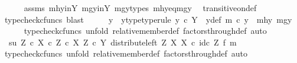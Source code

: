 \begin{isabellebody}
\ \ \ \ \isamarkupfalse%
\ assms\ mhy{\isacharunderscore}{\kern0pt}in{\isacharunderscore}{\kern0pt}Y\ mgy{\isacharunderscore}{\kern0pt}in{\isacharunderscore}{\kern0pt}Y\ mgy{\isacharunderscore}{\kern0pt}types\ mhy{}{\isacharunderscore}{\kern0pt}eq{\isacharunderscore}{\kern0pt}mgy{}\ \isamarkupfalse%
\ transitive{\isacharunderscore}{\kern0pt}on{\isacharunderscore}{\kern0pt}def\isanewline
\ \ \ \ \isamarkupfalse%
\ {\isacharparenleft}{\kern0pt}typecheck{\isacharunderscore}{\kern0pt}cfuncs{\isacharcomma}{\kern0pt}\ blast{\isacharparenright}{\kern0pt}\isanewline
\ \ \isamarkupfalse%
\ \isamarkupfalse%
\ y\ \ y{\isacharunderscore}{\kern0pt}type{\isacharbrackleft}{\kern0pt}type{\isacharunderscore}{\kern0pt}rule{\isacharbrackright}{\kern0pt}{\isacharcolon}{\kern0pt}\ {\isachardoublequoteopen}y\ {\isasymin}\isactrlsub c\ Y{\isachardoublequoteclose}\ \ y{\isacharunderscore}{\kern0pt}def{\isacharcolon}{\kern0pt}\ {\isachardoublequoteopen}m\ {\isasymcirc}\isactrlsub c\ y\ {\isacharequal}{\kern0pt}\ {\isasymlangle}mhy{}{\isacharcomma}{\kern0pt}\ mgy{}{\isasymrangle}{\isachardoublequoteclose}\isanewline
\ \ \ \ \isamarkupfalse%
\ {\isacharparenleft}{\kern0pt}typecheck{\isacharunderscore}{\kern0pt}cfuncs{\isacharcomma}{\kern0pt}\ unfold\ relative{\isacharunderscore}{\kern0pt}member{\isacharunderscore}{\kern0pt}def{}\ factors{\isacharunderscore}{\kern0pt}through{\isacharunderscore}{\kern0pt}def{}{\isacharcomma}{\kern0pt}\ auto{\isacharparenright}{\kern0pt}\isanewline
\ \ \isamarkupfalse%
\ {\isachardoublequoteopen}\ {\isasymlangle}s{\isacharcomma}{\kern0pt}u{\isasymrangle}\ {\isasymin}\isactrlbsub {\isacharparenleft}{\kern0pt}Z\ {\isasymtimes}\isactrlsub c\ X{\isacharparenright}{\kern0pt}\ {\isasymtimes}\isactrlsub c\ Z\ {\isasymtimes}\isactrlsub c\ X\isactrlesub \ {\isacharparenleft}{\kern0pt}Z\ {\isasymtimes}\isactrlsub c\ Y{\isacharcomma}{\kern0pt}\ distribute{\isacharunderscore}{\kern0pt}left\ Z\ X\ X\ {\isasymcirc}\isactrlsub c\ id\isactrlsub c\ Z\ {\isasymtimes}\isactrlsub f\ m{\isacharparenright}{\kern0pt}{\isachardoublequoteclose}\ \isanewline
\ \ \isamarkupfalse%
\ {\isacharparenleft}{\kern0pt}typecheck{\isacharunderscore}{\kern0pt}cfuncs{\isacharcomma}{\kern0pt}\ unfold\ relative{\isacharunderscore}{\kern0pt}member{\isacharunderscore}{\kern0pt}def{}\ factors{\isacharunderscore}{\kern0pt}through{\isacharunderscore}{\kern0pt}def{}{\isacharcomma}{\kern0pt}\ auto{\isacharparenright}{\kern0pt}\isanewline

\end{isabellebody}
